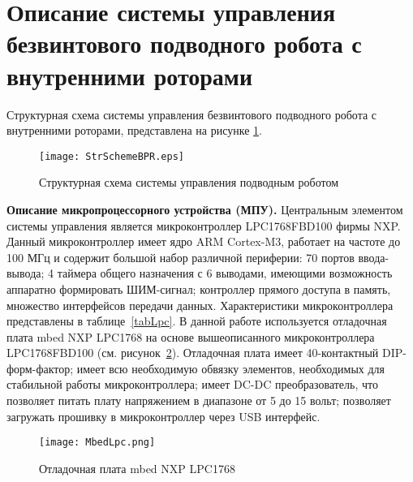 \section{Описание системы управления безвинтового подводного робота с внутренними роторами}

Структурная схема системы управления безвинтового подводного робота с внутренними роторами, представлена на рисунке \ref{str_scheme}.

\begin{figure}[h!]
	\begin{center}
		\texttt{[image: StrSchemeBPR.eps]}
		\caption{Структурная схема системы управления подводным роботом} \label{str_scheme}
	\end{center}
\end{figure}


\textbf{Описание микропроцессорного устройства (МПУ).} Центральным элементом системы управления является микроконтроллер LPC1768FBD100 фирмы NXP. Данный микроконтроллер имеет ядро ARM Cortex-M3, работает на частоте до 100 МГц и содержит большой набор различной периферии: 70 портов ввода-вывода; 4 таймера общего назначения с 6 выводами, имеющими возможность аппаратно формировать ШИМ-сигнал; контроллер прямого доступа в память, множество интерфейсов передачи данных. Характеристики микроконтроллера представлены в таблице~\ref{tabLpc}. В данной работе используется отладочная плата mbed NXP LPC1768 на основе вышеописанного микроконтроллера LPC1768FBD100 (см. рисунок~\ref{MbedLpc}).  Отладочная плата имеет 40-контактный DIP-форм-фактор; имеет всю необходимую обвязку элементов, необходимых для стабильной работы микроконтроллера; имеет DC-DC преобразователь, что позволяет питать плату напряжением в диапазоне от 5 до 15 вольт; позволяет загружать прошивку в микроконтроллер через USB интерфейс.

\begin{figure}[h]
	\centering
	\texttt{[image: MbedLpc.png]}%
	\caption{Отладочная плата mbed NXP LPC1768}
	\label{MbedLpc}
\end{figure}

